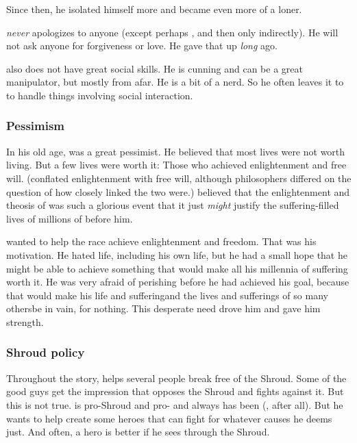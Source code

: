 Since then, he isolated himself more and became even more of a loner. 

\Ishnaruchaefir{} \emph{never} apologizes to anyone (except perhaps \Criseis, and then only indirectly). 
He will not ask anyone for forgiveness or love.
He gave that up \emph{long} ago. 

\Ishnaruchaefir{} also does not have great social skills. 
He is cunning and can be a great manipulator, but mostly from afar. 
He is a bit of a nerd. 
So he often leaves it to \Criseis{} to handle things involving social interaction. 





\subsubsection{Pessimism}
In his old age, \Iscrafel was a great pessimist. 
He believed that most lives were not worth living. 
But a few lives were worth it: 
Those who achieved enlightenment and free will. 
(\Iscrafel conflated enlightenment with free will, although philosophers differed on the question of how closely linked the two were.) 
\Iscrafel believed that the enlightenment and theosis of \Sethicus was such a glorious event that it just \emph{might} justify the suffering-filled lives of millions of \caisith before him. 

\Iscrafel wanted to help the \draconic race achieve enlightenment and freedom. 
That was his motivation. 
He hated life, including his own life, but he had a small hope that he might be able to achieve something that would make all his millennia of suffering worth it. 
He was very afraid of perishing before he had achieved his goal, because that would make his life and suffering\dash and the lives and sufferings of so many others\dash be in vain, for nothing. 
This desperate need drove him and gave him strength. 





\subsubsection{Shroud policy}
Throughout the story, \Ishnaruchaefir{} helps several people break free of the Shroud. 
Some of the good guys get the impression that \Ishnaruchaefir{} opposes the Shroud and fights against it. 
But this is not true. 
\Ishnaruchaefir{} is pro-Shroud and pro- and always has been (, after all). 
But he wants to help create some heroes that can fight for whatever causes he deems just. 
And often, a hero is better if he sees through the Shroud. 





